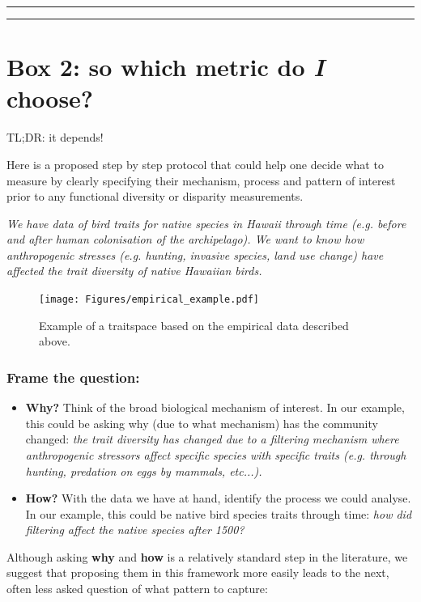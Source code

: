 \documentclass[12pt,letterpaper]{article}
\begin{document}
\bigskip
\bigskip
\hrule
\hrule

\section*{Box 2: so which metric do \textit{I} choose?}

TL;DR: it depends!

Here is a proposed step by step protocol that could help one decide what to measure by clearly specifying their mechanism, process and pattern of interest prior to any functional diversity or disparity measurements.

\textit{We have data of bird traits for native species in Hawaii through time (e.g. before and after human colonisation of the archipelago).
We want to know how anthropogenic stresses (e.g. hunting, invasive species, land use change) have affected the trait diversity of native Hawaiian birds.}

\begin{figure}[!htbp]
\centering
   \texttt{[image: Figures/empirical\_example.pdf]}
\caption{Example of a traitspace based on the empirical data described above.}
\label{Fig:trait_space_example}
\end{figure}
\bigskip

\subsubsection{Frame the question:}

\begin{itemize}

    \item \textbf{Why?} Think of the broad biological mechanism of interest. In our example, this could be asking why (due to what mechanism) has the community changed: \textit{the trait diversity has changed due to a filtering mechanism where anthropogenic stressors affect specific species with specific traits (e.g. through hunting, predation on eggs by mammals, etc...).}
    \item \textbf{How?} With the data we have at hand, identify the process we could analyse. In our example, this could be native bird species traits through time: \textit{how did filtering affect the native species after 1500?}

\end{itemize}

Although asking \textbf{why} and \textbf{how} is a relatively standard step in the literature, we suggest that proposing them in this framework more easily leads to the next, often less asked question of what pattern to capture:
\end{document}
